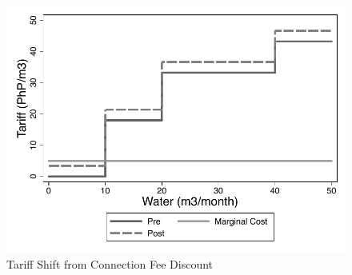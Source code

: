 \documentclass[12pt]{article}
\begin{document}
\begin{figure}
\centering
\caption{Tariff Shift from Connection Fee Discount}\label{figure:discounttariff}
\includegraphics[scale=.7]{tables/discount_tariff_groups.pdf}
\end{figure}
\end{document}
